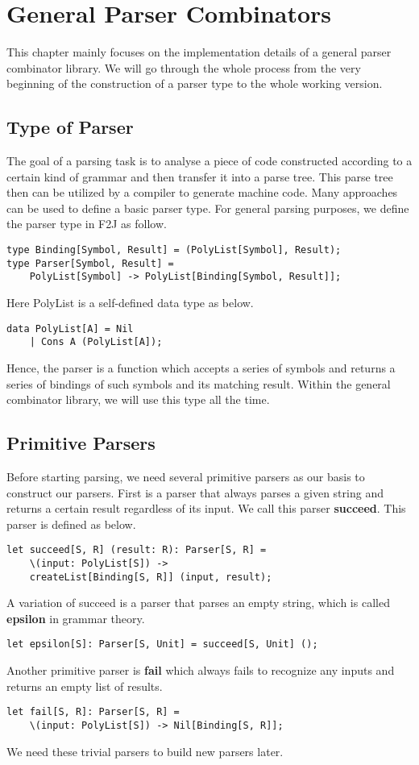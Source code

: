 \chapter{General Parser Combinators}
This chapter mainly focuses on the implementation details of a general parser combinator library. We will go through the whole process from the very beginning of the construction of a parser type to the whole working version.

\section{Type of Parser}
The goal of a parsing task is to analyse a piece of code constructed according to a certain kind of grammar and then transfer it into a parse tree. This parse tree then can be utilized by a compiler to generate machine code. Many approaches can be used to define a basic parser type. For general parsing purposes, we define the parser type in F2J as follow.
\begin{lstlisting}
type Binding[Symbol, Result] = (PolyList[Symbol], Result);
type Parser[Symbol, Result] = 
	PolyList[Symbol] -> PolyList[Binding[Symbol, Result]];
\end{lstlisting}
Here PolyList is a self-defined data type as below.
\begin{lstlisting}
data PolyList[A] = Nil
	| Cons A (PolyList[A]);
\end{lstlisting}
Hence, the parser is a function which accepts a series of symbols and returns a series of bindings of such symbols and its matching result. Within the general combinator library, we will use this type all the time.

\section{Primitive Parsers}
Before starting parsing, we need several primitive parsers as our basis to construct our parsers. First is a parser that always parses a given string and returns a certain result regardless of its input. We call this parser \textbf{succeed}. This parser is defined as below.
\begin{lstlisting}
let succeed[S, R] (result: R): Parser[S, R] =
	\(input: PolyList[S]) -> 
	createList[Binding[S, R]] (input, result);
\end{lstlisting}
A variation of succeed is a parser that parses an empty string, which is called \textbf{epsilon} in grammar theory.
\begin{lstlisting}
let epsilon[S]: Parser[S, Unit] = succeed[S, Unit] ();
\end{lstlisting}
Another primitive parser is \textbf{fail} which always fails to recognize any inputs and returns an empty list of results.
\begin{lstlisting}
let fail[S, R]: Parser[S, R] =
	\(input: PolyList[S]) -> Nil[Binding[S, R]];
\end{lstlisting}
We need these trivial parsers to build new parsers later.

